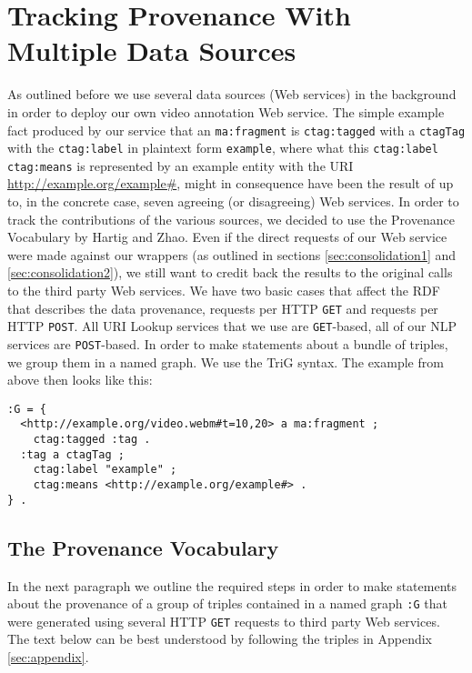 \documentclass{acm_proc_article-sp}
\begin{document}
\section{Tracking Provenance With Multiple Data Sources}\label{sec:tracking}
As outlined before we use several data sources (Web services) in the background in order to deploy our own video annotation Web service. The simple example fact produced by our service that an \texttt{ma:fragment} is \texttt{ctag:tagged} with a \texttt{ctagTag} with the \texttt{ctag:label} in plaintext form \texttt{example}, where what this \texttt{ctag:label} \texttt{ctag:means} is represented by an example entity with the URI \url{http://example.org/example#}, might in consequence have been the result of up to, in the concrete case, seven agreeing (or disagreeing) Web services. In order to track the contributions of the various sources, we decided to use the Provenance Vocabulary\cite{Hartig:Provenance} by Hartig and Zhao. Even if the direct requests of our Web service were made against our wrappers (as outlined in sections \ref{sec:consolidation1} and \ref{sec:consolidation2}), we still want to credit back the results to the original calls to the third party Web services. We have two basic cases that affect the RDF that describes the data provenance, requests per HTTP \texttt{GET} and requests per HTTP \texttt{POST}. All URI Lookup services that we use are \texttt{GET}-based, all of our NLP services are \texttt{POST}-based. In order to make statements about a bundle of triples, we group them in a named graph. We use the TriG\cite{Bizer:TriG} syntax. The example from above then looks like this:
\begin{verbatim}
:G = {
  <http://example.org/video.webm#t=10,20> a ma:fragment ;
    ctag:tagged :tag .
  :tag a ctagTag ;
    ctag:label "example" ;
    ctag:means <http://example.org/example#> .
} .
\end{verbatim}
\subsection{The Provenance Vocabulary}\label{sec:provenance}
In the next paragraph we outline the required steps in order to make statements about the provenance of a group of triples contained in a named graph \texttt{:G} that were generated using several HTTP \texttt{GET} requests to third party Web services. The text below can be best understood by following the triples in Appendix \ref{sec:appendix}.
\end{document}
